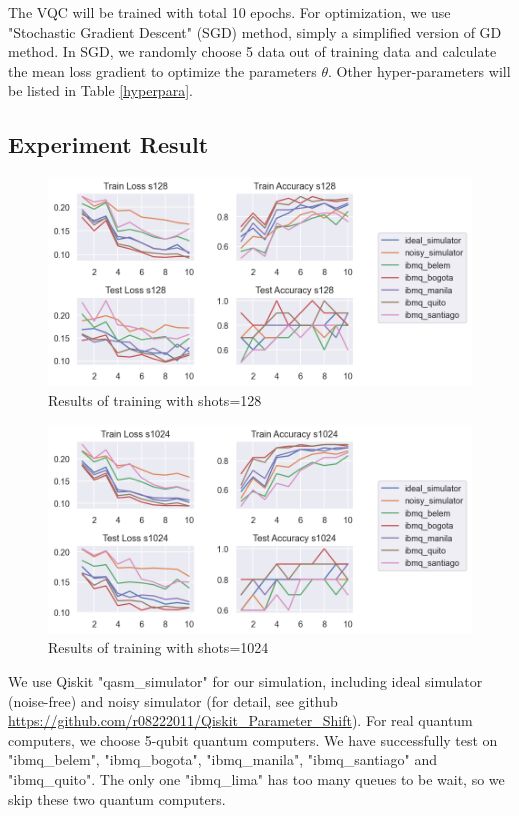 \documentclass{article}
\begin{document}
The VQC will be trained with total 10 epochs. For optimization, we use "Stochastic Gradient Descent" (SGD) method, simply a simplified version of GD method. In SGD, we randomly choose 5 data out of training data and calculate the mean loss gradient to optimize the parameters $\theta$. Other hyper-parameters will be listed in Table \ref{hyperpara}.

\subsection{Experiment Result}

\begin{figure}
    \centering
    \includegraphics[scale=0.8]{s128.png}
    \caption{Results of training with shots=128}
    \label{s128}
\end{figure}
\begin{figure}
    \centering
    \includegraphics[scale=0.8]{s1024.png}
    \caption{Results of training with shots=1024}
    \label{s1024}
\end{figure}
We use Qiskit "qasm\_simulator" for our simulation, including ideal simulator (noise-free) and noisy simulator (for detail, see github \url{https://github.com/r08222011/Qiskit\_Parameter\_Shift}). For real quantum computers, we choose 5-qubit quantum computers. We have successfully test on "ibmq\_belem", "ibmq\_bogota", "ibmq\_manila", "ibmq\_santiago" and "ibmq\_quito". The only one "ibmq\_lima" has too many queues to be wait, so we skip these two quantum computers.
\end{document}
